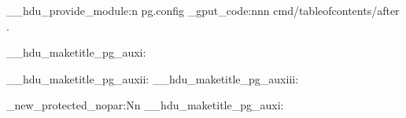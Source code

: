 \ExplSyntaxOn \makeatletter
\__hdu_provide_module:n {pg.config}
\geometry { top = 2.8cm, bottom = 3.2cm, left = 3.2cm, right = 3.2cm,
            headheight = 15pt, headsep = .72cm, footskip = 1.5cm }
\fancyhead[C]
  { \raisebox { .12ex } { \small 杭州电子科技大学硕士学位论文 } }
\hook_gput_code:nnn { cmd/tableofcontents/after } { . }
  {
    \clearpage
    \cfoot{\small \thepage}
  }
\RenewDocumentCommand \maketitle {}
  {
    \begin{titlepage}
      \__hdu_maketitle_pg_auxi:
    \end{titlepage}
    \titlepage
      \__hdu_maketitle_pg_auxii:
    \endtitlepage
    \titlepage
      \__hdu_maketitle_pg_auxiii:
    \endtitlepage
    \restoregeometry
    \cfoot {\small \thepage}
  }
\cs_new_protected_nopar:Nn \__hdu_maketitle_pg_auxi:
